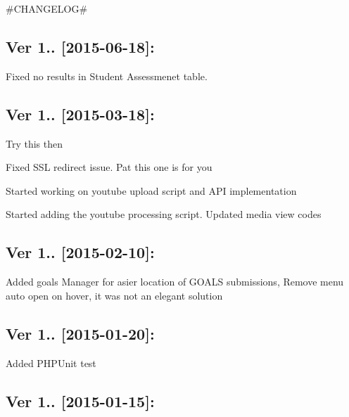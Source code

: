 \#\+C\+H\+A\+N\+G\+E\+L\+O\+G\#

\subsection*{Ver 1.. \mbox{[}2015-\/06-\/18\mbox{]}\+: }


\begin{DoxyItemize}
\item Fixed no results in Student Assessmenet table.
\end{DoxyItemize}

\subsection*{Ver 1.. \mbox{[}2015-\/03-\/18\mbox{]}\+: }


\begin{DoxyItemize}
\item Try this then
\item Fixed S\+S\+L redirect issue. Pat this one is for you
\item Started working on youtube upload script and A\+P\+I implementation
\item Started adding the youtube processing script. Updated media view codes
\end{DoxyItemize}

\subsection*{Ver 1.. \mbox{[}2015-\/02-\/10\mbox{]}\+: }


\begin{DoxyItemize}
\item Added goals Manager for asier location of G\+O\+A\+L\+S submissions, Remove menu auto open on hover, it was not an elegant solution
\end{DoxyItemize}

\subsection*{Ver 1.. \mbox{[}2015-\/01-\/20\mbox{]}\+: }


\begin{DoxyItemize}
\item Added  P\+H\+P\+Unit test
\end{DoxyItemize}

\subsection*{Ver 1.. \mbox{[}2015-\/01-\/15\mbox{]}\+: }


